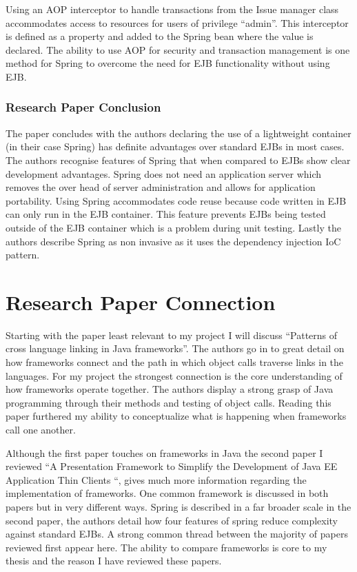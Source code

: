 \documentclass{article}
\begin{document}
		Using an AOP interceptor to handle transactions from the Issue manager class accommodates access to resources for users of privilege “admin”. This interceptor is defined as a property and added to the Spring bean where the value is declared. The ability to use AOP for security and transaction management is one method for Spring to overcome the need for EJB functionality without using EJB.
	
		\subsubsection{Research Paper Conclusion}
		The paper concludes with the authors declaring the use of a lightweight container (in their case Spring) has definite advantages over standard EJBs in most cases. The authors recognise features of Spring that when compared to EJBs show clear development advantages. Spring does not need an application server which removes the over head of server administration and allows for application portability. Using Spring accommodates code reuse because code written in EJB can only run in the EJB container. This feature prevents EJBs being tested outside of the EJB container which is a problem during unit testing. Lastly the authors describe Spring as non invasive as it uses the dependency injection IoC pattern. 

\section{Research Paper Connection}

Starting with the paper least relevant to my project I will discuss “Patterns of cross language linking in Java frameworks”. The authors go in to great detail on how frameworks connect and the path in which object calls traverse links in the languages. For my project the strongest connection is the core understanding of how frameworks operate together. The authors display a strong grasp of Java programming through their methods and testing of object calls. Reading this paper furthered my ability to conceptualize what is happening when frameworks call one another. 

Although the first paper touches on frameworks in Java the second paper I reviewed “A Presentation Framework to Simplify the Development of Java EE Application Thin 
Clients “, gives much more information regarding the implementation of frameworks. One common framework is discussed in both papers but in very different ways. Spring is described in a far broader scale in the second paper, the authors detail how four features of spring reduce complexity against standard EJBs. A strong common thread between the majority of papers reviewed first appear here. The ability to compare frameworks is core to my thesis and the reason I have reviewed these papers. 
\end{document}
